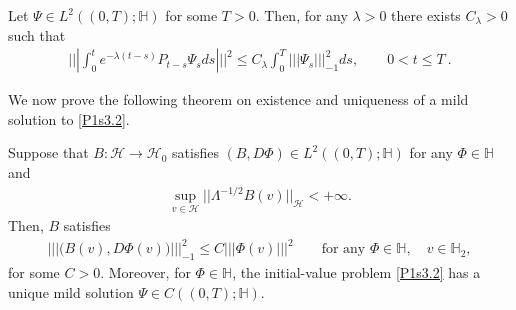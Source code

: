 \documentclass[review,onefignum,onetabnum]{siamart190516}
\begin{document}
\begin{lemma}\label{Lemma.s3.1}
    Let $\Psi\in L^2((0,T);\mathbb{H})$ for some $T>0$. Then, for any
    $\lambda>0$ there exists $C_\lambda>0$ such that
     \begin{align}
        |||\int_0^t e^{-\lambda (t-s)} P_{t-s} \Psi_{s} ds |||^2 \le C_\lambda
        \int_0^T |||\Psi_s|||_{-1}^2 ds,
        \qquad 0< t\le T
        \ .
        \label{s3.1.0}
     \end{align}
\end{lemma}

    We now prove the following theorem on existence and uniqueness of a mild
    solution to \eqref{P1s3.2}.
\begin{theorem}
    \label{Th-EU}
    Suppose that $B:\mathcal{H}\rightarrow \mathcal{H}_0$ satisfies
    $
        (B,D\Phi)\in
        L^2((0,T);\mathbb{H})
    $ for any $\Phi\in\mathbb{H}$ and
    \begin{align}
        \sup_{v\in \mathcal{H}} ||\Lambda^{-1/2}B(v)||_{\mathcal{H}}
            <+\infty.
    \end{align}
    Then, $B$ satisfies
    \begin{align}
        ||| \big(B(v),D\Phi(v) \big) |||_{-1}^2 \le C |||\Phi(v) |||^2  \qquad
        \mbox{for any } \Phi\in \mathbb{H},
        \quad v\in \mathbb{H}_2 ,
        \label{s3.1.1}
    \end{align}
    for some $C>0$.
    Moreover, for $\Phi\in \mathbb{H}$, the initial-value problem
    \eqref{P1s3.2} has a unique mild solution
    $\Psi\in C((0,T); \mathbb{H})$.
\end{theorem}
\end{document}
